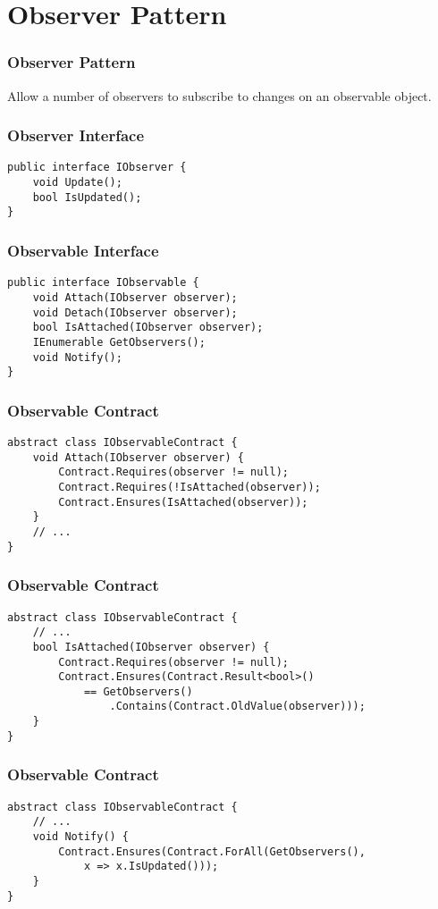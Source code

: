 \section{Observer Pattern}

\begin{frame}
    \frametitle{Observer Pattern}
        Allow a number of observers to subscribe to changes on an observable
        object.
\end{frame}

\begin{frame}[fragile]
    \frametitle{Observer Interface}
    \begin{verbatim}
public interface IObserver {
    void Update();
    bool IsUpdated();
}
    \end{verbatim}
\end{frame}

\begin{frame}[fragile]
    \frametitle{Observable Interface}
    \begin{verbatim}
public interface IObservable {
    void Attach(IObserver observer);
    void Detach(IObserver observer);
    bool IsAttached(IObserver observer);
    IEnumerable GetObservers();
    void Notify();
}
    \end{verbatim}
\end{frame}

\begin{frame}[fragile]
    \frametitle{Observable Contract}
    \begin{verbatim}
abstract class IObservableContract {
    void Attach(IObserver observer) {
        Contract.Requires(observer != null);
        Contract.Requires(!IsAttached(observer));
        Contract.Ensures(IsAttached(observer));
    }
    // ...
}
    \end{verbatim}
\end{frame}

\begin{frame}[fragile]
    \frametitle{Observable Contract}
    \begin{verbatim}
abstract class IObservableContract {
    // ...
    bool IsAttached(IObserver observer) {
        Contract.Requires(observer != null);
        Contract.Ensures(Contract.Result<bool>() 
            == GetObservers()
                .Contains(Contract.OldValue(observer)));
    }
}
    \end{verbatim}
\end{frame}

\begin{frame}[fragile]
    \frametitle{Observable Contract}
    \begin{verbatim}
abstract class IObservableContract {
    // ...
    void Notify() {
        Contract.Ensures(Contract.ForAll(GetObservers(), 
            x => x.IsUpdated()));
    }
}
    \end{verbatim}
\end{frame}



